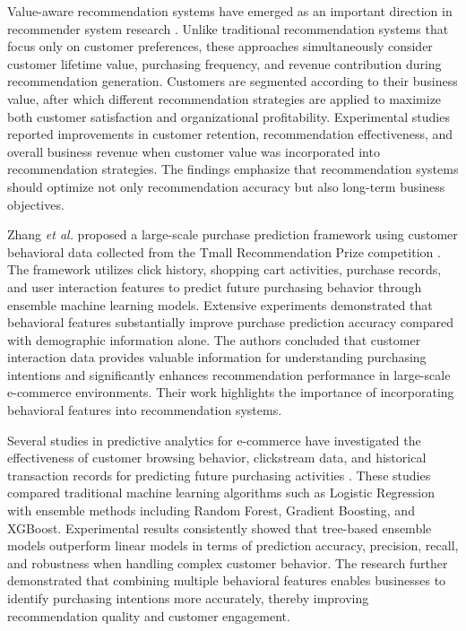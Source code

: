 \documentclass[12pt, a4paper]{report}
\numberwithin{figure}{chapter}
\numberwithin{table}{chapter}
\numberwithin{equation}{chapter}
\begin{document}
Value-aware recommendation systems have emerged as an important direction in recommender system research \cite{valueaware}. Unlike traditional recommendation systems that focus only on customer preferences, these approaches simultaneously consider customer lifetime value, purchasing frequency, and revenue contribution during recommendation generation. Customers are segmented according to their business value, after which different recommendation strategies are applied to maximize both customer satisfaction and organizational profitability. Experimental studies reported improvements in customer retention, recommendation effectiveness, and overall business revenue when customer value was incorporated into recommendation strategies. The findings emphasize that recommendation systems should optimize not only recommendation accuracy but also long-term business objectives.

Zhang \textit{et al.} proposed a large-scale purchase prediction framework using customer behavioral data collected from the Tmall Recommendation Prize competition \cite{zhang}. The framework utilizes click history, shopping cart activities, purchase records, and user interaction features to predict future purchasing behavior through ensemble machine learning models. Extensive experiments demonstrated that behavioral features substantially improve purchase prediction accuracy compared with demographic information alone. The authors concluded that customer interaction data provides valuable information for understanding purchasing intentions and significantly enhances recommendation performance in large-scale e-commerce environments. Their work highlights the importance of incorporating behavioral features into recommendation systems.

Several studies in predictive analytics for e-commerce have investigated the effectiveness of customer browsing behavior, clickstream data, and historical transaction records for predicting future purchasing activities \cite{predictive}. These studies compared traditional machine learning algorithms such as Logistic Regression with ensemble methods including Random Forest, Gradient Boosting, and XGBoost. Experimental results consistently showed that tree-based ensemble models outperform linear models in terms of prediction accuracy, precision, recall, and robustness when handling complex customer behavior. The research further demonstrated that combining multiple behavioral features enables businesses to identify purchasing intentions more accurately, thereby improving recommendation quality and customer engagement.
\end{document}
